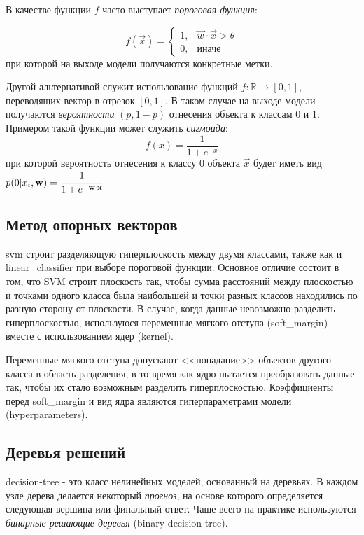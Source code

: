 В качестве функции $f$ часто выступает \textit{пороговая функция}:

\begin{equation}
    \label{eq:threshold_func}
    f(\vec{x}) =
    \begin{cases}
        1, & \vec{w} \cdot \vec{x} > \theta \\
        0, & \text{иначе}
    \end{cases}
\end{equation}
при которой на выходе модели получаются конкретные метки.

Другой альтернативой служит использование функций $f: \mathbb{R} \rightarrow [0, 1]$, переводящих вектор в отрезок $[0, 1]$.
В таком случае на выходе модели получаются \textit{вероятности} $(p, 1 - p)$ отнесения объекта к классам 0 и 1.
Примером такой функции может служить \textit{сигмоида}:
\begin{equation}
    \label{eq:sigmoid}
    f (x) = \frac{1}{1 + e^{-x}}
\end{equation}
при которой вероятность отнесения к классу 0 объекта $\vec{x}$ будет иметь вид $p(0 | x_i, \vec{w}) = \cfrac{1}{1 + e^{-\vec{w} \cdot \vec{x}}}$
\subsection{Метод опорных векторов}
\Gls{svm} строит разделяющую гиперплоскость между двумя классами, также как и \gls{linear_classifier} при выборе пороговой функции.
Основное отличие состоит в том, что SVM строит плоскость так, чтобы сумма расстояний между плоскостью и точками одного класса была наибольшей и точки разных классов находились по разную сторону от плоскости.
В случае, когда данные невозможно разделить гиперплоскостью, используюся переменные мягкого отступа (\gls{soft_margin}) вместе с использованием ядер (\gls{kernel}).

Переменные мягкого отступа допускают <<попадание>> объектов другого класса в область разделения, в то время как ядро пытается преобразовать данные так, чтобы их стало возможным разделить гиперплоскостью. Коэффициенты перед \gls{soft_margin} и вид ядра являются гиперпараметрами модели (\gls{hyperparameters}).

\subsection{Деревья решений}
\label{par:decision-trees}
\Gls{decision-tree} - это класс нелинейных моделей, основанный на деревьях.
В каждом узле дерева делается некоторый \textit{прогноз}, на основе которого определяется следующая вершина или финальный ответ.
Чаще всего на практике используются \textit{бинарные решающие деревья} (\gls{binary-decision-tree}).


